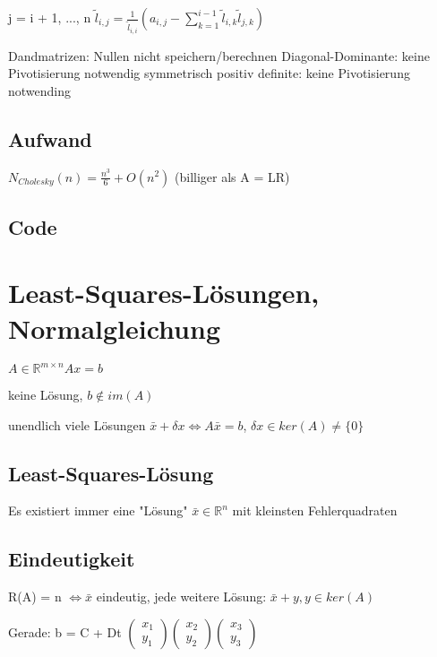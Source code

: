 \documentclass[12pt,a4paper]{article} %
\newcommand*\tab[1][1cm]{\hspace*{#1}}
\begin{document}
	j = i + 1, ..., n \tab $ \tilde{l}_{i, j} = \frac{1}{\tilde{l}_{i, i}}(a_{i, j} - \sum\limits_{k = 1}^{i - 1}\tilde{l}_{i, k}\tilde{l}_{j, k})$
	
	Dandmatrizen: Nullen nicht speichern/berechnen Diagonal-Dominante: keine Pivotisierung notwendig symmetrisch positiv definite: keine Pivotisierung notwending
	
	\subsection{Aufwand}
	
	$N_{Cholesky}(n) = \frac{n^3}{6} + O(n^2)$ \tab (billiger als A = LR)
	
	\subsection{Code}
	
	\newpage
	
	\section{Least-Squares-Lösungen, Normalgleichung}
	
	$A \in \mathbb{R}^{m \times n} Ax = b$
	
	keine Lösung, $b \notin im(A)$
	
	unendlich viele Lösungen $\bar{x} + \delta x \Leftrightarrow A\bar{x}= b$, $\delta x \in ker(A) \ne \{0\}$
	
	\subsection{Least-Squares-Lösung}
	
	Es existiert immer eine "Lösung" $\bar{x} \in \mathbb{R}^n$ mit kleinsten Fehlerquadraten
	
	\subsection{Eindeutigkeit}
	
	R(A) = n $\Leftrightarrow \bar{x}$ eindeutig, jede weitere Lösung: $\bar{x} + y, y \in ker(A)$
	
	Gerade: b = C + Dt 
	$\begin{pmatrix}
		x_1 \\
		y_1
	\end{pmatrix}
	\begin{pmatrix}
	x_2 \\
	y_2
	\end{pmatrix}
	\begin{pmatrix}
	x_3 \\
	y_3
	\end{pmatrix}$
	
\end{document}
